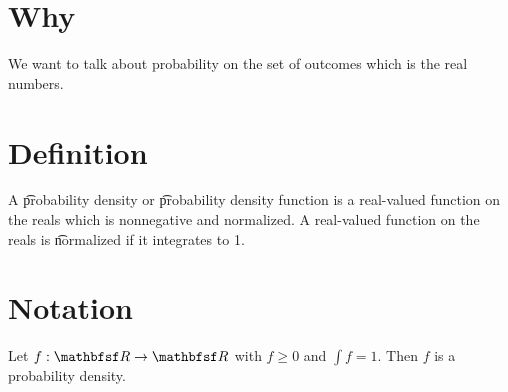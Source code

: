 

\section*{Why}

We want to talk about probability on the set of outcomes which is the real numbers.

\section*{Definition}

A \t{probability density} or \t{probability density function} is a real-valued function on the reals which is nonnegative and normalized.
A real-valued function on the reals is \t{normalized} if it integrates to 1.


\section*{Notation}

Let $f: \R  \to \R $ with $f \geq 0$ and $\int f = 1$.
Then $f$ is a probability density.

\blankpage